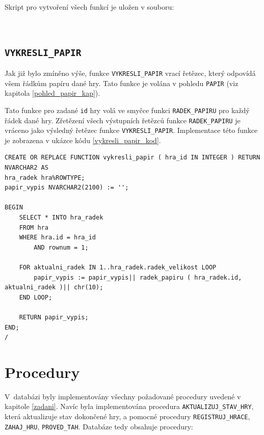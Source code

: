\documentclass[
11pt,
a4paper,
pdftex,
czech,
titlepage
]{report}
\begin{document}
\noindent Skript pro vytvoření všech funkcí je uložen v souboru:
\begin{center}
\noindent {}\\[1\baselineskip]
\end{center}

\subsection{\texttt{VYKRESLI\_PAPIR}}\label{vykresli_papir_kap}
Jak již bylo zmíněno výše, funkce \texttt{VYKRESLI\_PAPIR} vrací řetězec, který odpovídá všem řádkům papíru dané hry. Tato funkce je volána v pohledu \texttt{PAPIR} (viz kapitola \ref{pohled_papir_kap}). 

Tato funkce pro zadané \texttt{id} hry volá ve smyčce funkci \texttt{RADEK\_PAPIRU} pro každý řádek dané hry. Zřetězení všech výstupních řetězců funkce \texttt{RADEK\_PAPIRU} je vráceno jako výsledný řetězec funkce \texttt{VYKRESLI\_PAPIR}. Implementace této funkce je zobrazena v ukázce kódu \ref{vykresli_papir_kod}.

\renewcommand{\lstlistingname}{Ukázka kódu}
\begin{lstlisting}
CREATE OR REPLACE FUNCTION vykresli_papir ( hra_id IN INTEGER ) RETURN NVARCHAR2 AS
hra_radek hra%ROWTYPE;
papir_vypis NVARCHAR2(2100) := '';   

BEGIN
    SELECT * INTO hra_radek 
    FROM hra 
    WHERE hra.id = hra_id
        AND rownum = 1;

    FOR aktualni_radek IN 1..hra_radek.radek_velikost LOOP
        papir_vypis := papir_vypis|| radek_papiru ( hra_radek.id, aktualni_radek )|| chr(10);
    END LOOP;
    
    RETURN papir_vypis;
END;
/
\end{lstlisting}

\section{Procedury}
V~databázi byly implementovány všechny požadované procedury uvedené v kapitole \ref{zadani}. Navíc byla implementována procedura \texttt{AKTUALIZUJ\_STAV\_HRY}, která aktualizuje stav dokončené hry, a pomocné procedury \texttt{REGISTRUJ\_HRACE}, \texttt{ZAHAJ\_HRU}, \texttt{PROVED\_TAH}. Databáze tedy obsahuje procedury:
\end{document}

